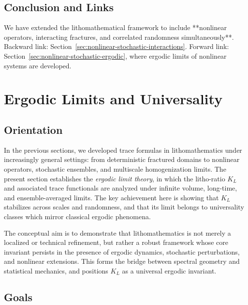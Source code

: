 \subsection*{Conclusion and Links}

We have extended the lithomathematical framework to include **nonlinear operators, interacting fractures, and correlated randomness simultaneously**.  
Backward link: Section~\ref{sec:nonlinear-stochastic-interactions}.  
Forward link: Section~\ref{sec:nonlinear-stochastic-ergodic}, where ergodic limits of nonlinear systems are developed.  


\section{Ergodic Limits and Universality}
\label{sec:trace-ergodic-limits}

\subsection*{Orientation}

In the previous sections, we developed trace formulas in lithomathematics under
increasingly general settings: from deterministic fractured domains to nonlinear
operators, stochastic ensembles, and multiscale homogenization limits. The
present section establishes the \emph{ergodic limit theory}, in which the
litho-ratio $K_L$ and associated trace functionals are analyzed under infinite
volume, long-time, and ensemble-averaged limits. The key achievement here is
showing that $K_L$ stabilizes across scales and randomness, and that its limit
belongs to universality classes which mirror classical ergodic phenomena.  

The conceptual aim is to demonstrate that lithomathematics is not merely a
localized or technical refinement, but rather a robust framework whose core
invariant persists in the presence of ergodic dynamics, stochastic perturbations,
and nonlinear extensions. This forms the bridge between spectral geometry and
statistical mechanics, and positions $K_L$ as a universal ergodic invariant.

\subsection*{Goals}

